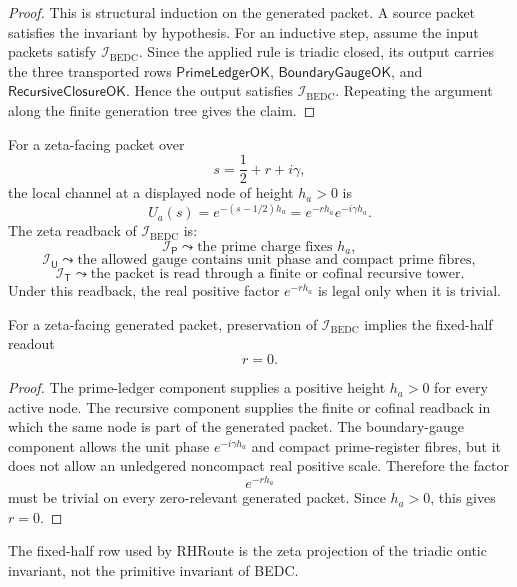 \begin{proof}
This is structural induction on the generated packet.  A source packet
satisfies the invariant by hypothesis.  For an inductive step, assume
the input packets satisfy $\mathcal I_{\mathrm{BEDC}}$.  Since the
applied rule is triadic closed, its output carries the three transported
rows $\mathsf{PrimeLedgerOK}$, $\mathsf{BoundaryGaugeOK}$, and
$\mathsf{RecursiveClosureOK}$.  Hence the output satisfies
$\mathcal I_{\mathrm{BEDC}}$.  Repeating the argument along the finite
generation tree gives the claim.
\end{proof}

\begin{definition}
\label{def:unified-reality-zeta-readback-triadic-invariant}
For a zeta-facing packet over
$$
s=\frac12+r+i\gamma,
$$
the local channel at a displayed node of height $h_a>0$ is
$$
U_a(s)=e^{-(s-1/2)h_a}
=
e^{-r h_a}e^{-i\gamma h_a}.
$$
The zeta readback of $\mathcal I_{\mathrm{BEDC}}$ is:
$$
\mathcal I_{\mathsf P}
\leadsto
\text{the prime charge fixes }h_a,
$$
$$
\mathcal I_{\mathsf U}
\leadsto
\text{the allowed gauge contains unit phase and compact prime fibres},
$$
$$
\mathcal I_{\mathsf T}
\leadsto
\text{the packet is read through a finite or cofinal recursive tower}.
$$
Under this readback, the real positive factor $e^{-r h_a}$ is legal only
when it is trivial.
\end{definition}

\begin{theorem}
\label{thm:unified-reality-triadic-ontic-readback-gives-fixed-half}
For a zeta-facing generated packet, preservation of
$\mathcal I_{\mathrm{BEDC}}$ implies the fixed-half readout
$$
r=0.
$$
\end{theorem}

\begin{proof}
The prime-ledger component supplies a positive height $h_a>0$ for every
active node.  The recursive component supplies the finite or cofinal
readback in which the same node is part of the generated packet.  The
boundary-gauge component allows the unit phase
$e^{-i\gamma h_a}$ and compact prime-register fibres, but it does not
allow an unledgered noncompact real positive scale.  Therefore the
factor
$$
e^{-r h_a}
$$
must be trivial on every zero-relevant generated packet.  Since $h_a>0$,
this gives $r=0$.
\end{proof}

\begin{corollary}
\label{cor:unified-reality-fixed-half-projection-not-primitive-invariant}
The fixed-half row used by RHRoute is the zeta projection of the triadic
ontic invariant, not the primitive invariant of BEDC.
\end{corollary}

